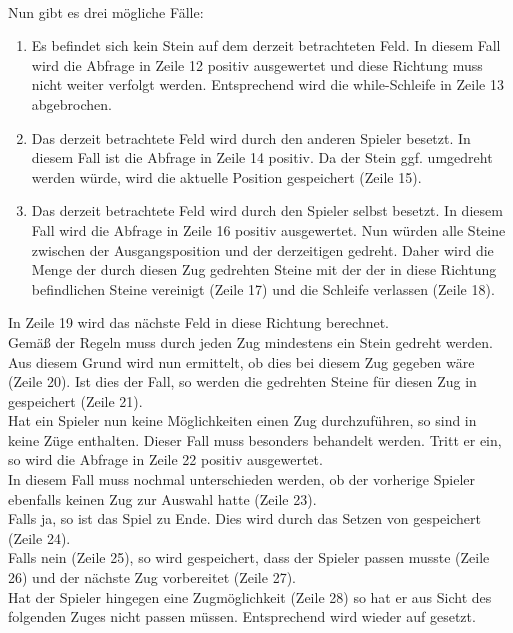 \\Nun gibt es drei mögliche Fälle:
\begin{enumerate}
\setcounter{enumi}{0}
\item Es befindet sich kein Stein auf dem derzeit betrachteten Feld. In diesem Fall wird die Abfrage in Zeile 12 positiv ausgewertet und diese Richtung muss nicht weiter verfolgt werden. Entsprechend wird die while-Schleife in Zeile 13 abgebrochen.
\item Das derzeit betrachtete Feld wird durch den anderen Spieler besetzt. In diesem Fall ist die Abfrage in Zeile 14 positiv. Da der Stein ggf. umgedreht werden würde, wird die aktuelle Position gespeichert (Zeile 15).
\item Das derzeit betrachtete Feld wird durch den Spieler selbst besetzt. In diesem Fall wird die Abfrage in Zeile 16 positiv ausgewertet. Nun würden alle Steine zwischen der Ausgangsposition und der derzeitigen gedreht. Daher wird die Menge der durch diesen Zug gedrehten Steine mit der der in diese Richtung befindlichen Steine vereinigt (Zeile 17) und die Schleife verlassen (Zeile 18).
\end{enumerate}
In Zeile 19 wird das nächste Feld in diese Richtung berechnet.
\\Gemäß der Regeln muss durch jeden Zug mindestens ein Stein gedreht werden. Aus diesem Grund wird nun ermittelt, ob dies bei diesem Zug gegeben wäre (Zeile 20). Ist dies der Fall, so werden die gedrehten Steine für diesen Zug in  gespeichert (Zeile 21).
\\Hat ein Spieler nun keine Möglichkeiten einen Zug durchzuführen, so sind in \\ keine Züge enthalten. Dieser Fall muss besonders behandelt werden. Tritt er ein, so wird die Abfrage in Zeile 22 positiv ausgewertet.
\\In diesem Fall muss nochmal unterschieden werden, ob der vorherige Spieler ebenfalls keinen Zug zur Auswahl hatte (Zeile 23).
\\Falls ja, so ist das Spiel zu Ende. Dies wird durch das Setzen von  gespeichert (Zeile 24).
\\Falls nein (Zeile 25), so wird gespeichert, dass der Spieler passen musste (Zeile 26) und der nächste Zug vorbereitet (Zeile 27).
\\Hat der Spieler hingegen eine Zugmöglichkeit (Zeile 28) so hat er aus Sicht des folgenden Zuges nicht passen müssen. Entsprechend wird  wieder auf  gesetzt. 
